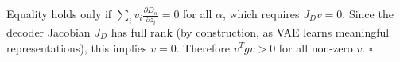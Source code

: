 \documentclass[11pt,a4paper]{article}
\begin{document}
Equality holds only if $\sum_i v_i \frac{\partial D_\alpha}{\partial z_i} = 0$ for all $\alpha$, which requires $J_D v = 0$. Since the decoder Jacobian $J_D$ has full rank (by construction, as VAE learns meaningful representations), this implies $v = 0$. Therefore $v^T g v > 0$ for all non-zero $v$. $\square$
\end{document}
